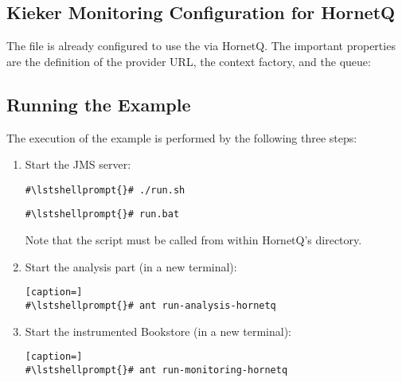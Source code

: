 \subsection{Kieker Monitoring Configuration for HornetQ}

The file  %
is already configured to use the  via HornetQ. The important properties are %
the definition of the provider URL, the context factory, and the queue:

\setPropertiesListing


\setPropertiesListing


\subsection{Running the Example}

 The execution of the example is performed by the following three steps:
\begin{enumerate}
\item Start the JMS server:

\setBashListing
\begin{lstlisting}[caption=Start of the JMS server under UNIX-like systems]
#\lstshellprompt{}# ./run.sh
\end{lstlisting}
\begin{lstlisting}[caption=Start of the JMS server under Windows]
#\lstshellprompt{}# run.bat
\end{lstlisting}

Note that the script must be called from within HornetQ's  directory.

\item Start the analysis part (in a new terminal):
\setBashListing
\begin{lstlisting}[caption=]
#\lstshellprompt{}# ant run-analysis-hornetq
\end{lstlisting}
\item Start the instrumented Bookstore (in a new terminal):
\setBashListing
\begin{lstlisting}[caption=]
#\lstshellprompt{}# ant run-monitoring-hornetq
\end{lstlisting}
\end{enumerate}


